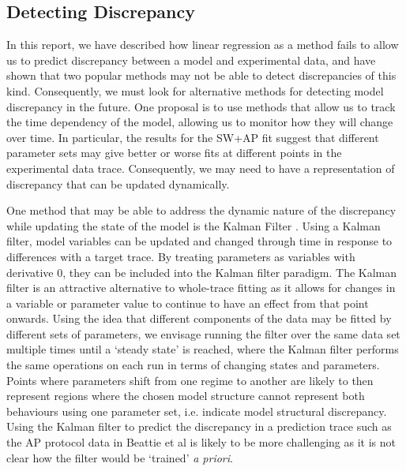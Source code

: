 \documentclass[11pt,a4paper,oneside]{article}
\begin{document}
\subsection{Detecting Discrepancy}

In this report, we have described how linear regression as a method fails to allow us to predict discrepancy between a model and experimental data, and have shown that two popular methods may not be able to detect discrepancies of this kind. Consequently, we must look for alternative methods for detecting model discrepancy in the future. One proposal is to use methods that allow us to track the time dependency of the model, allowing us to monitor how they will change over time. In particular, the results for the SW+AP fit suggest that different parameter sets may give better or worse fits at different points in the experimental data trace. Consequently, we may need to have a representation of discrepancy that can be updated dynamically. 

One method that may be able to address the dynamic nature of the discrepancy while updating the state of the model is the Kalman Filter \cite{Reich2015}. Using a Kalman filter, model variables can be updated and changed through time in response to differences with a target trace. By treating parameters as variables with derivative 0, they can be included into the Kalman filter paradigm. The Kalman filter is an attractive alternative to whole-trace fitting as it allows for changes in a variable or parameter value to continue to have an effect from that point onwards. Using the idea that different components of the data may be fitted by different sets of parameters, we envisage running the filter over the same data set multiple times until a `steady state' is reached, where the Kalman filter performs the same operations on each run in terms of changing states and parameters. Points where parameters shift from one regime to another are likely to then represent regions where the chosen model structure cannot represent both behaviours using one parameter set, i.e. indicate model structural discrepancy. Using the Kalman filter to predict the discrepancy in a prediction trace such as the AP protocol data in Beattie et al \cite{Beattie2018} is likely to be more challenging as it is not clear how the filter would be `trained' \textit{a priori}.
\end{document}
